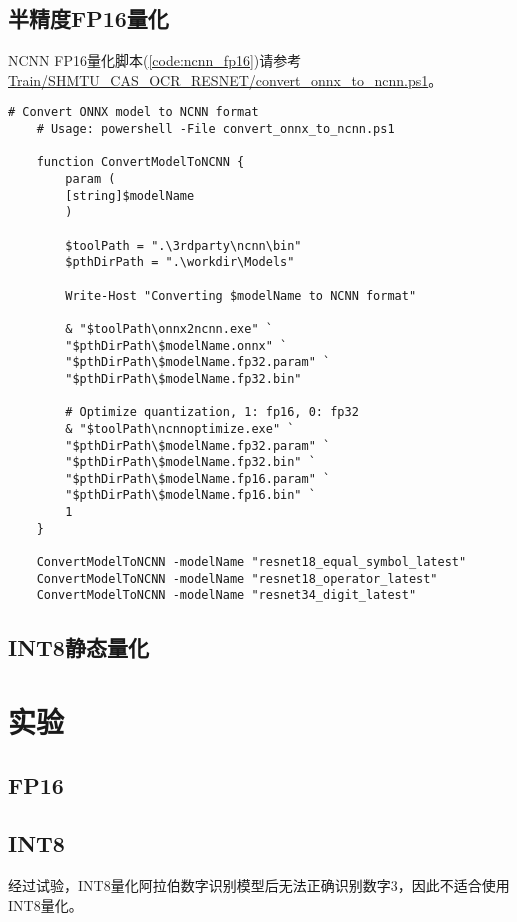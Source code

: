 \subsection{半精度FP16量化}

NCNN FP16量化脚本(\ref{code:ncnn_fp16})请参考\url{Train/SHMTU_CAS_OCR_RESNET/convert_onnx_to_ncnn.ps1}。

\begin{lstlisting}[caption={NCNN FP16量化},label=code:ncnn_fp16]
	# Convert ONNX model to NCNN format
	# Usage: powershell -File convert_onnx_to_ncnn.ps1

	function ConvertModelToNCNN {
		param (
		[string]$modelName
		)

		$toolPath = ".\3rdparty\ncnn\bin"
		$pthDirPath = ".\workdir\Models"

		Write-Host "Converting $modelName to NCNN format"

		& "$toolPath\onnx2ncnn.exe" `
		"$pthDirPath\$modelName.onnx" `
		"$pthDirPath\$modelName.fp32.param" `
		"$pthDirPath\$modelName.fp32.bin"

		# Optimize quantization, 1: fp16, 0: fp32
		& "$toolPath\ncnnoptimize.exe" `
		"$pthDirPath\$modelName.fp32.param" `
		"$pthDirPath\$modelName.fp32.bin" `
		"$pthDirPath\$modelName.fp16.param" `
		"$pthDirPath\$modelName.fp16.bin" `
		1
	}

	ConvertModelToNCNN -modelName "resnet18_equal_symbol_latest"
	ConvertModelToNCNN -modelName "resnet18_operator_latest"
	ConvertModelToNCNN -modelName "resnet34_digit_latest"

\end{lstlisting}

\subsection{INT8静态量化}

\section{实验}

\subsection{FP16}

\subsection{INT8}

经过试验，INT8量化阿拉伯数字识别模型后无法正确识别数字3，因此不适合使用INT8量化。